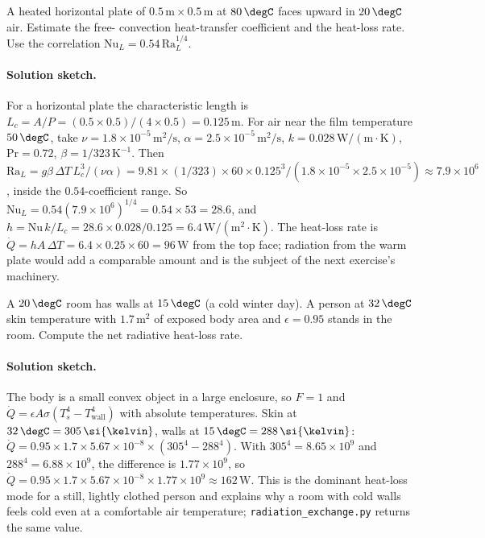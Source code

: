 \begin{exercise}
A heated horizontal plate of $0.5\,\text{m} \times 0.5\,\text{m}$ at
$80\,\degC$ faces upward in $20\,\degC$ air. Estimate the free-
convection heat-transfer coefficient and the heat-loss rate. Use the
correlation $\text{Nu}_L = 0.54\,\text{Ra}_L^{1/4}$.
\paragraph{Solution sketch.} For a horizontal plate the characteristic
length is $L_c = A/P = (0.5 \times 0.5)/(4 \times 0.5) = 0.125\,\text{m}$.
For air near the film temperature $50\,\degC$, take $\nu = 1.8\times
10^{-5}\,\text{m}^2/\text{s}$, $\alpha = 2.5\times10^{-5}\,\text{m}^2/
\text{s}$, $k = 0.028\,\text{W}/(\text{m}\cdot\si{\kelvin})$,
$\text{Pr} = 0.72$, $\beta = 1/323\,\si{\kelvin}^{-1}$. Then
$\text{Ra}_L = g\beta\,\Delta T\,L_c^3/(\nu\alpha) = 9.81 \times
(1/323) \times 60 \times 0.125^3/(1.8\times10^{-5}\times2.5\times
10^{-5}) \approx 7.9 \times 10^6$, inside the $0.54$-coefficient range.
So $\text{Nu}_L = 0.54(7.9\times10^6)^{1/4} = 0.54 \times 53 = 28.6$,
and $h = \text{Nu}\,k/L_c = 28.6 \times 0.028/0.125 = 6.4\,\text{W}/
(\text{m}^2\cdot\si{\kelvin})$. The heat-loss rate is $\dot{Q} = hA\,
\Delta T = 6.4 \times 0.25 \times 60 = 96\,\text{W}$ from the top face;
radiation from the warm plate would add a comparable amount and is the
subject of the next exercise's machinery.
\end{exercise}

\begin{exercise}
A $20\,\degC$ room has walls at $15\,\degC$ (a cold winter day). A
person at $32\,\degC$ skin temperature with $1.7\,\text{m}^2$ of
exposed body area and $\epsilon = 0.95$ stands in the room. Compute
the net radiative heat-loss rate.
\paragraph{Solution sketch.} The body is a small convex object in a
large enclosure, so $F = 1$ and $\dot{Q} = \epsilon A \sigma (T_s^4 -
T_{\text{wall}}^4)$ with absolute temperatures. Skin at $32\,\degC =
305\,\si{\kelvin}$, walls at $15\,\degC = 288\,\si{\kelvin}$:
$\dot{Q} = 0.95 \times 1.7 \times 5.67\times10^{-8} \times (305^4 -
288^4)$. With $305^4 = 8.65\times10^9$ and $288^4 = 6.88\times10^9$,
the difference is $1.77\times10^9$, so $\dot{Q} = 0.95 \times 1.7
\times 5.67\times10^{-8} \times 1.77\times10^9 \approx 162\,\text{W}$.
This is the dominant heat-loss mode for a still, lightly clothed person
and explains why a room with cold walls feels cold even at a comfortable
air temperature; \texttt{radiation\_exchange.py} returns the same value.
\end{exercise}

